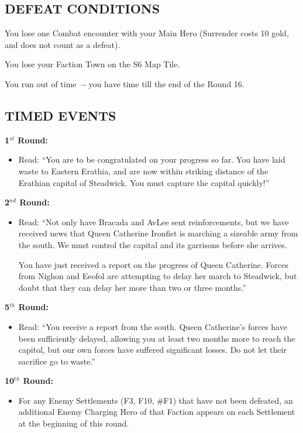 \begin{multicols*}{2}
\subsection*{\MakeUppercase{Defeat Conditions}}

You lose one Combat encounter with your Main Hero (Surrender costs 10 gold, and does not count as a defeat).

You lose your Faction Town on the S6 Map Tile.

You run out of time –- you have time till the end of the Round 16.

\subsection*{\MakeUppercase{Timed Events}}

\textbf{1$^{st}$ Round:}
\begin{itemize}
  \item Read: ``You are to be congratulated on your progress so far. 
    You have laid waste to Eastern Erathia, and are now within striking distance of the Erathian
    capital of Steadwick. You must capture the capital quickly!''
\end{itemize}

\textbf{2$^{nd}$ Round:}
\begin{itemize}
  \item Read: ``Not only have Bracada and AvLee sent reinforcements, but we have received news that
    Queen Catherine Ironfist is marching a sizeable army from the south. We must control the capital and its
    garrisons before she arrives.
    
    You have just received a report on the progress of Queen Catherine.
    Forces from Nighon and Eeofol are attempting to delay her march to Steadwick,
    but doubt that they can delay her more than two or three months.''
\end{itemize}

\textbf{5$^{th}$ Round:}
\begin{itemize}
  \item Read: ``You receive a report from the south. Queen Catherine's forces have been sufficiently delayed,
    allowing you at least two months more to reach the capitol, but our own forces have suffered significant
    losses. Do not let their sacrifice go to waste.''
\end{itemize}

\textbf{10$^{th}$ Round:}
\begin{itemize}
  \item For any Enemy Settlements (F3, F10, \#F1) that have not been defeated, an additional Enemy
    Charging Hero of that Faction appears on each Settlement at the beginning of this round.
\end{itemize}


\end{multicols*}

